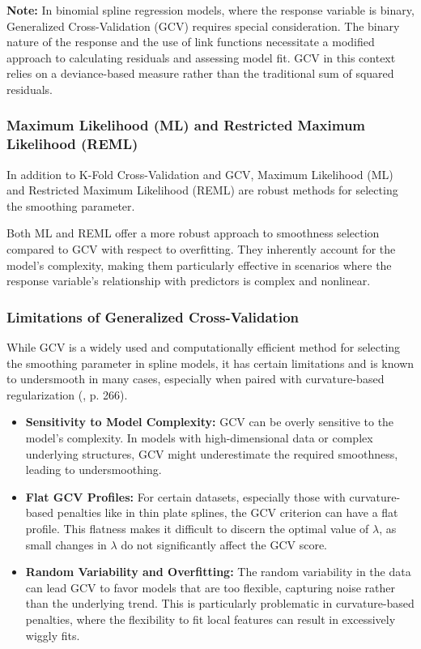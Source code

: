 \documentclass[12pt, twoside,hidelinks]{article}
\theoremstyle{definition}
\numberwithin{equation}{section}
\begin{document}
\textbf{Note:} In binomial spline regression models, where the response variable is binary, Generalized Cross-Validation (GCV) requires special consideration. The binary nature of the response and the use of link functions necessitate a modified approach to calculating residuals and assessing model fit. GCV in this context relies on a deviance-based measure rather than the traditional sum of squared residuals.


\subsubsection{Maximum Likelihood (ML) and Restricted Maximum Likelihood (REML)}\label{sec:smooth:lambda:mlreml}
In addition to K-Fold Cross-Validation and GCV, Maximum Likelihood (ML) and Restricted Maximum Likelihood (REML) are robust methods for selecting the smoothing parameter.

Both ML and REML offer a more robust approach to smoothness selection compared to GCV with respect to overfitting. They inherently account for the model's complexity, making them particularly effective in scenarios where the response variable's relationship with predictors is complex and nonlinear.

\subsubsection{Limitations of Generalized Cross-Validation}\label{sec:smooth:lambda:limgcv}
While GCV is a widely used and computationally efficient method for selecting the smoothing parameter in spline models, it has certain limitations and is known to undersmooth in many cases, especially when paired with curvature-based regularization (\citet{wood2017}, p. 266).
\newline

\begin{itemize}
    \item \textbf{Sensitivity to Model Complexity:} GCV can be overly sensitive to the model's complexity. In models with high-dimensional data or complex underlying structures, GCV might underestimate the required smoothness, leading to undersmoothing.
    
    \item \textbf{Flat GCV Profiles:} For certain datasets, especially those with curvature-based penalties like in thin plate splines, the GCV criterion can have a flat profile. This flatness makes it difficult to discern the optimal value of \(\lambda\), as small changes in \(\lambda\) do not significantly affect the GCV score.
    
    \item \textbf{Random Variability and Overfitting:} The random variability in the data can lead GCV to favor models that are too flexible, capturing noise rather than the underlying trend. This is particularly problematic in curvature-based penalties, where the flexibility to fit local features can result in excessively wiggly fits.
\end{itemize}
\end{document}
